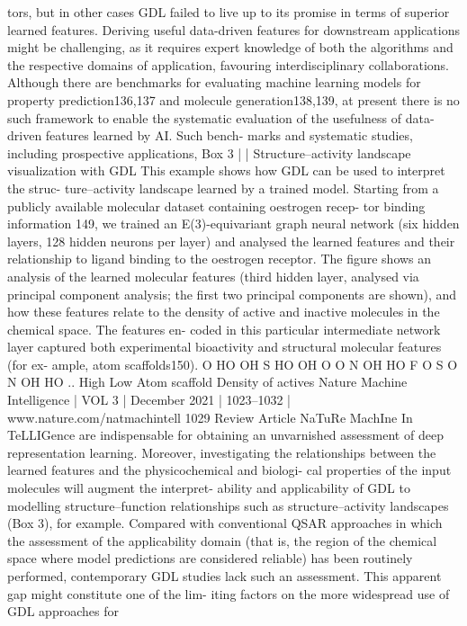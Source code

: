 tors, but in other cases GDL failed to live up to its promise in terms
of superior learned features. Deriving useful data-driven features for
downstream applications might be challenging, as it requires expert
knowledge of both the algorithms and the respective domains of
application, favouring interdisciplinary collaborations. Although
there are benchmarks for evaluating machine learning models for
property prediction136,137 and molecule generation138,139, at present
there is no such framework to enable the systematic evaluation of
the usefulness of data-driven features learned by AI. Such bench-
marks and systematic studies, including prospective applications,
Box 3 | | Structure–activity landscape visualization with GDL
This example shows how GDL can be used to interpret the struc-
ture–activity landscape learned by a trained model. Starting from
a publicly available molecular dataset containing oestrogen recep-
tor binding information 149, we trained an E(3)-equivariant graph
neural network (six hidden layers, 128 hidden neurons per layer)
and analysed the learned features and their relationship to ligand
binding to the oestrogen receptor. The figure shows an analysis of
the learned molecular features (third hidden layer, analysed via
principal component analysis; the first two principal components
are shown), and how these features relate to the density of active
and inactive molecules in the chemical space. The features en-
coded in this particular intermediate network layer captured both
experimental bioactivity and structural molecular features (for ex-
ample, atom scaffolds150).
O
HO
OH
S
HO
OH
O
O
N
OH
HO
F
O
S
O
N
OH
HO
..
High
Low
Atom scaffold
Density of actives
Nature Machine Intelligence | VOL 3 | December 2021 | 1023–1032 | www.nature.com/natmachintell
1029
Review Article
NaTuRe MachIne In TeLLIGence
are indispensable for obtaining an unvarnished assessment of deep
representation learning. Moreover, investigating the relationships
between the learned features and the physicochemical and biologi-
cal properties of the input molecules will augment the interpret-
ability and applicability of GDL to modelling structure–function
relationships such as structure–activity landscapes (Box 3), for
example.
Compared with conventional QSAR approaches in which the
assessment of the applicability domain (that is, the region of the
chemical space where model predictions are considered reliable)
has been routinely performed, contemporary GDL studies lack such
an assessment. This apparent gap might constitute one of the lim-
iting factors on the more widespread use of GDL approaches for
